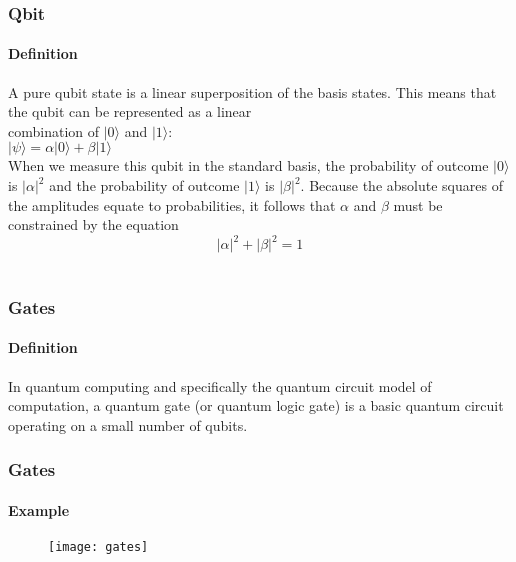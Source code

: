 \begin{frame}
	\frametitle{Qbit}
		\framesubtitle{Definition}
		\vspace{-1cm}
	{\normalsize
	A pure qubit state is a linear superposition of the basis states. This means that the qubit can be represented as a linear\\ combination of $|0\rangle$ and $|1\rangle $:\\ 
    $|\psi \rangle =\alpha |0\rangle +\beta |1\rangle$\\
  
    When we measure this qubit in the standard basis, the probability of outcome $|0\rangle$  is $|\alpha |^{2}$ and the probability of outcome $|1\rangle$  is $|\beta |^{2}$. Because the absolute squares of the amplitudes equate to probabilities, it follows that
     $\alpha$ and $\beta$ must be constrained by the equation
$$|\alpha |^{2}+|\beta |^{2}=1$$\\
	}
\end{frame}

\begin{frame}
	\frametitle{Gates}
		\framesubtitle{Definition}
		\vspace{-1cm}
	{\normalsize
    \begin{block}{}	
{In quantum computing and specifically the quantum circuit model of computation, a quantum gate (or quantum logic gate) is a basic quantum circuit operating on a small number of qubits.}\\
	\end{block}
	}
\end{frame}

\begin{frame}
	\frametitle{Gates}
		\framesubtitle{Example}
	\vspace{0.5cm}
		\begin{figure}
		\centering
			\texttt{[image: gates]}
			\label{fig:gates gates}
		\end{figure}

\end{frame}


